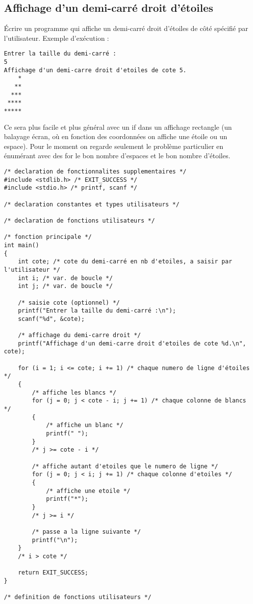\subsection{Affichage d'un demi-carré droit d'étoiles}


Écrire un programme  qui affiche un demi-carré droit d'étoiles de côté spécifié par l'utilisateur. Exemple d'exécution :
\begin{small}
\begin{verbatim}
Entrer la taille du demi-carré :
5
Affichage d'un demi-carre droit d'etoiles de cote 5.
    *
   **
  ***
 ****
*****
\end{verbatim}
\end{small}

\begin{correction}
Ce sera plus facile et plus général avec un if dans un affichage rectangle (un balayage écran, où en
fonction des coordonnées on affiche une étoile ou un espace). Pour le
moment on regarde seulement le problème particulier en énumérant avec
des for le bon nombre d'espaces et le bon nombre d'étoiles.
\begin{verbatim}
/* declaration de fonctionnalites supplementaires */
#include <stdlib.h> /* EXIT_SUCCESS */
#include <stdio.h> /* printf, scanf */

/* declaration constantes et types utilisateurs */

/* declaration de fonctions utilisateurs */

/* fonction principale */
int main()
{
    int cote; /* cote du demi-carré en nb d'etoiles, a saisir par l'utilisateur */
    int i; /* var. de boucle */
    int j; /* var. de boucle */

    /* saisie cote (optionnel) */
    printf("Entrer la taille du demi-carré :\n");
    scanf("%d", &cote);

    /* affichage du demi-carre droit */
    printf("Affichage d'un demi-carre droit d'etoiles de cote %d.\n", cote);

    for (i = 1; i <= cote; i += 1) /* chaque numero de ligne d'étoiles */
    {
        /* affiche les blancs */
        for (j = 0; j < cote - i; j += 1) /* chaque colonne de blancs */
        {
            /* affiche un blanc */
            printf(" ");
        }
        /* j >= cote - i */

        /* affiche autant d'etoiles que le numero de ligne */
        for (j = 0; j < i; j += 1) /* chaque colonne d'etoiles */
        {
            /* affiche une etoile */
            printf("*");
        }
        /* j >= i */

        /* passe a la ligne suivante */
        printf("\n");
    }
    /* i > cote */

    return EXIT_SUCCESS;
}

/* definition de fonctions utilisateurs */

\end{verbatim}
\end{correction}

